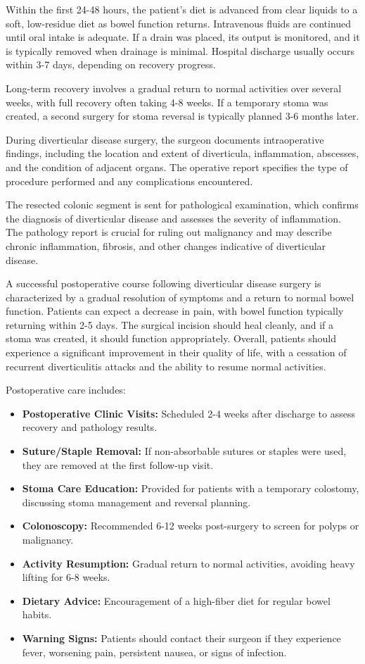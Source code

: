Within the first 24-48 hours, the patient's diet is advanced from clear liquids to a soft, low-residue diet as bowel function returns. Intravenous fluids are continued until oral intake is adequate. If a drain was placed, its output is monitored, and it is typically removed when drainage is minimal. Hospital discharge usually occurs within 3-7 days, depending on recovery progress.

Long-term recovery involves a gradual return to normal activities over several weeks, with full recovery often taking 4-8 weeks. If a temporary stoma was created, a second surgery for stoma reversal is typically planned 3-6 months later.

During diverticular disease surgery, the surgeon documents intraoperative findings, including the location and extent of diverticula, inflammation, abscesses, and the condition of adjacent organs. The operative report specifies the type of procedure performed and any complications encountered.

The resected colonic segment is sent for pathological examination, which confirms the diagnosis of diverticular disease and assesses the severity of inflammation. The pathology report is crucial for ruling out malignancy and may describe chronic inflammation, fibrosis, and other changes indicative of diverticular disease.

A successful postoperative course following diverticular disease surgery is characterized by a gradual resolution of symptoms and a return to normal bowel function. Patients can expect a decrease in pain, with bowel function typically returning within 2-5 days. The surgical incision should heal cleanly, and if a stoma was created, it should function appropriately. Overall, patients should experience a significant improvement in their quality of life, with a cessation of recurrent diverticulitis attacks and the ability to resume normal activities.

Postoperative care includes:

\begin{itemize}
  \item \textbf{Postoperative Clinic Visits:} Scheduled 2-4 weeks after discharge to assess recovery and pathology results.
  \item \textbf{Suture/Staple Removal:} If non-absorbable sutures or staples were used, they are removed at the first follow-up visit.
  \item \textbf{Stoma Care Education:} Provided for patients with a temporary colostomy, discussing stoma management and reversal planning.
  \item \textbf{Colonoscopy:} Recommended 6-12 weeks post-surgery to screen for polyps or malignancy.
  \item \textbf{Activity Resumption:} Gradual return to normal activities, avoiding heavy lifting for 6-8 weeks.
  \item \textbf{Dietary Advice:} Encouragement of a high-fiber diet for regular bowel habits.
  \item \textbf{Warning Signs:} Patients should contact their surgeon if they experience fever, worsening pain, persistent nausea, or signs of infection.
\end{itemize}

